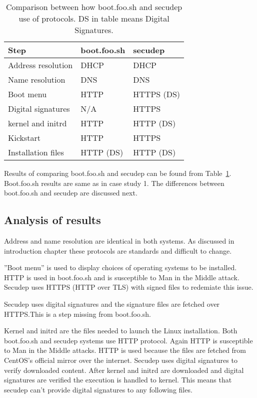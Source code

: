 \begin{table}[!ht]
  \def\arraystretch{1.1}%
  \begin{center}
    \begin{tabular}{| l | l | l |}
      \hline
      Step               & boot.foo.sh   & secudep    \\
      \hline
      Address resolution & DHCP          & DHCP       \\
      Name resolution    & DNS           & DNS        \\
      Boot menu          & HTTP          & HTTPS (DS) \\
      Digital signatures & N/A           & HTTPS      \\
      kernel and initrd  & HTTP          & HTTP (DS)  \\
      Kickstart          & HTTP          & HTTPS      \\
      Installation files & HTTP (DS)     & HTTP (DS)  \\
      \hline
    \end{tabular}
    \caption{Comparison between how boot.foo.sh and secudep use of
      protocols. DS in table means Digital
      Signatures.\label{tab:comparison_table}}
  \end{center}
\end{table}

Results of comparing boot.foo.sh and secudep can be found from
Table~\ref{tab:comparison_table}. Boot.foo.sh results are same as in
case study 1. The differences between boot.foo.sh and secudep are
discussed next.


\subsection{Analysis of results}

Address and name resolution are identical in both systems. As
discussed in introduction chapter these protocols are standards and
difficult to change.

''Boot menu'' is used to display choices of operating systems to be
installed. HTTP is used in boot.foo.sh and is susceptible to Man in
the Middle attack. Secudep uses HTTPS (HTTP over TLS) with signed
files to redemiate this issue.

Secudep uses digital signatures and the signature files are fetched
over HTTPS.\@ This is a step missing from boot.foo.sh.

Kernel and initrd are the files needed to launch the Linux
installation. Both boot.foo.sh and secudep systems use HTTP
protocol. Again HTTP is susceptible to Man in the Middle attacks. HTTP
is used because the files are fetched from CentOS's official mirror
over the internet. Secudep uses digital signatures to verify
downloaded content. After kernel and initrd are downloaded and digital
signatures are verified the execution is handled to kernel. This means
that secudep can't provide digital signatures to any following files.


